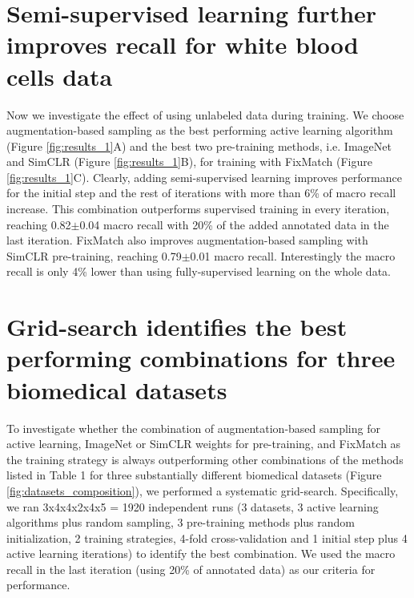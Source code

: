 \section{Semi-supervised learning further improves recall for white blood cells data}
Now we investigate the effect of using unlabeled data during training. We choose augmentation-based sampling as the best performing active learning algorithm (Figure \ref{fig:results_1}A) and the best two pre-training methods, i.e. ImageNet and SimCLR (Figure \ref{fig:results_1}B), for training with FixMatch (Figure \ref{fig:results_1}C). Clearly, adding semi-supervised learning improves performance for the initial step and the rest of iterations with more than 6\% of macro recall increase. This combination outperforms supervised training in every iteration, reaching 0.82$\pm$0.04 macro recall with 20\% of the added annotated data in the last iteration. FixMatch also improves augmentation-based sampling with SimCLR pre-training, reaching 0.79$\pm$0.01 macro recall. Interestingly the macro recall is only 4\% lower than using fully-supervised learning on the whole data. 

\section{Grid-search identifies the best performing combinations for three biomedical datasets}
To investigate whether the combination of augmentation-based sampling for active learning, ImageNet or SimCLR weights for pre-training, and FixMatch as the training strategy is always outperforming other combinations of the methods listed in Table 1 for three substantially different biomedical datasets (Figure \ref{fig:datasets_composition}), we performed a systematic grid-search. Specifically, we ran 3x4x4x2x4x5 = 1920 independent runs (3 datasets, 3 active learning algorithms plus random sampling, 3 pre-training methods plus random initialization, 2 training strategies, 4-fold cross-validation and 1 initial step plus 4 active learning iterations) to identify the best combination. We used the macro recall in the last iteration (using 20\% of annotated data) as our criteria for performance.

